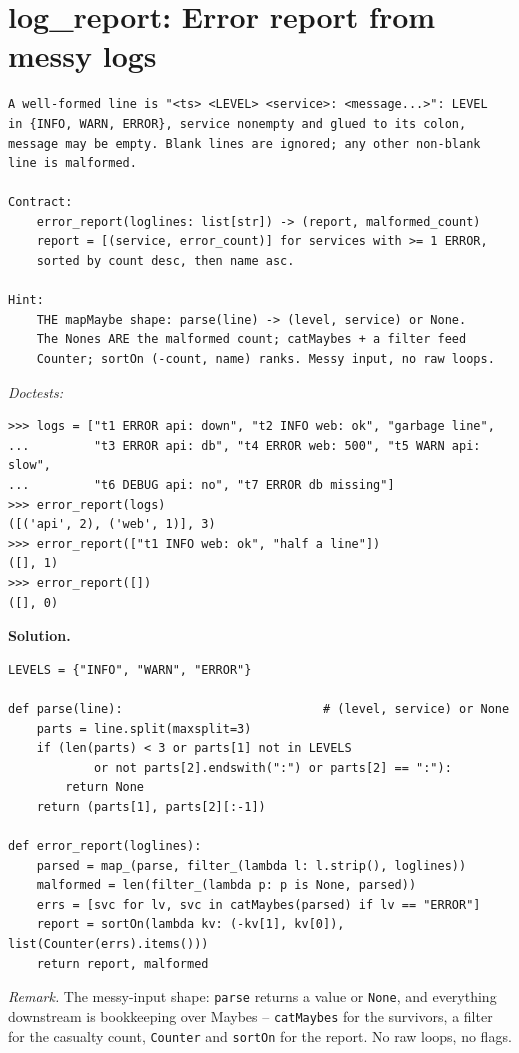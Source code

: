 \documentclass[11pt,letterpaper]{book}
\begin{document}
\section{log\_report: Error report from messy logs}
\begin{lstlisting}[style=spec]
A well-formed line is "<ts> <LEVEL> <service>: <message...>": LEVEL
in {INFO, WARN, ERROR}, service nonempty and glued to its colon,
message may be empty. Blank lines are ignored; any other non-blank
line is malformed.

Contract:
    error_report(loglines: list[str]) -> (report, malformed_count)
    report = [(service, error_count)] for services with >= 1 ERROR,
    sorted by count desc, then name asc.

Hint:
    THE mapMaybe shape: parse(line) -> (level, service) or None.
    The Nones ARE the malformed count; catMaybes + a filter feed
    Counter; sortOn (-count, name) ranks. Messy input, no raw loops.
\end{lstlisting}
\noindent\textit{Doctests:}
\begin{lstlisting}[style=spec]
>>> logs = ["t1 ERROR api: down", "t2 INFO web: ok", "garbage line",
...         "t3 ERROR api: db", "t4 ERROR web: 500", "t5 WARN api: slow",
...         "t6 DEBUG api: no", "t7 ERROR db missing"]
>>> error_report(logs)
([('api', 2), ('web', 1)], 3)
>>> error_report(["t1 INFO web: ok", "half a line"])
([], 1)
>>> error_report([])
([], 0)
\end{lstlisting}
\noindent\textbf{Solution.}
\begin{lstlisting}[style=code]
LEVELS = {"INFO", "WARN", "ERROR"}

def parse(line):                            # (level, service) or None
    parts = line.split(maxsplit=3)
    if (len(parts) < 3 or parts[1] not in LEVELS
            or not parts[2].endswith(":") or parts[2] == ":"):
        return None
    return (parts[1], parts[2][:-1])

def error_report(loglines):
    parsed = map_(parse, filter_(lambda l: l.strip(), loglines))
    malformed = len(filter_(lambda p: p is None, parsed))
    errs = [svc for lv, svc in catMaybes(parsed) if lv == "ERROR"]
    report = sortOn(lambda kv: (-kv[1], kv[0]), list(Counter(errs).items()))
    return report, malformed
\end{lstlisting}

\noindent\textit{Remark.} The messy-input shape: \texttt{parse} returns a value or
\texttt{None}, and everything downstream is bookkeeping over Maybes --
\texttt{catMaybes} for the survivors, a filter for the casualty count,
\texttt{Counter} and \texttt{sortOn} for the report. No raw loops, no flags.
\end{document}
